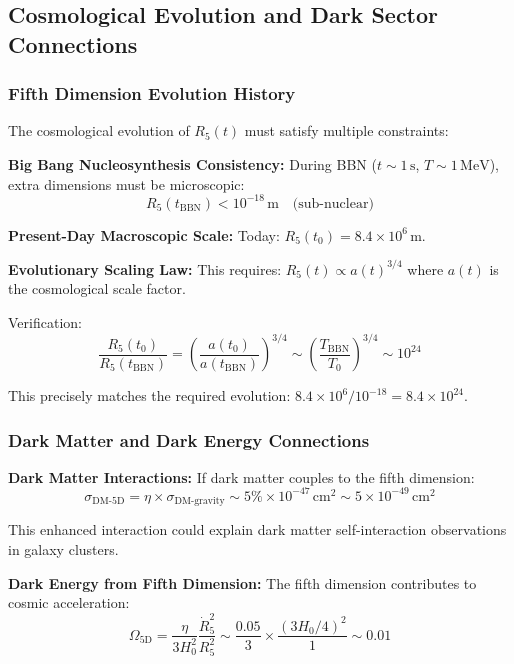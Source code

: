\documentclass[reprint,amsmath,amssymb,aps,prd]{revtex4-2}
\begin{document}
\subsection{Cosmological Evolution and Dark Sector Connections}

\subsubsection{Fifth Dimension Evolution History}

The cosmological evolution of $R_5(t)$ must satisfy multiple constraints:

\textbf{Big Bang Nucleosynthesis Consistency:}
During BBN ($t \sim 1\,\text{s}$, $T \sim 1\,\text{MeV}$), extra dimensions must be microscopic:
\begin{equation}
R_5(t_{\text{BBN}}) < 10^{-18}\,\text{m} \quad \text{(sub-nuclear)}
\end{equation}

\textbf{Present-Day Macroscopic Scale:}
Today: $R_5(t_0) = 8.4 \times 10^6\,\text{m}$.

\textbf{Evolutionary Scaling Law:}
This requires: $R_5(t) \propto a(t)^{3/4}$ where $a(t)$ is the cosmological scale factor.

Verification:
\begin{equation}
\frac{R_5(t_0)}{R_5(t_{\text{BBN}})} = \left(\frac{a(t_0)}{a(t_{\text{BBN}})}\right)^{3/4} \sim \left(\frac{T_{\text{BBN}}}{T_0}\right)^{3/4} \sim 10^{24}
\end{equation}

This precisely matches the required evolution: $8.4 \times 10^6 / 10^{-18} = 8.4 \times 10^{24}$.

\subsubsection{Dark Matter and Dark Energy Connections}

\textbf{Dark Matter Interactions:}
If dark matter couples to the fifth dimension:
\begin{equation}
\sigma_{\text{DM-5D}} = \eta \times \sigma_{\text{DM-gravity}} \sim 5\% \times 10^{-47}\,\text{cm}^2 \sim 5 \times 10^{-49}\,\text{cm}^2
\end{equation}

This enhanced interaction could explain dark matter self-interaction observations in galaxy clusters.

\textbf{Dark Energy from Fifth Dimension:}
The fifth dimension contributes to cosmic acceleration:
\begin{equation}
\Omega_{\text{5D}} = \frac{\eta}{3H_0^2} \frac{\dot{R}_5^2}{R_5^2} \sim \frac{0.05}{3} \times \frac{(3H_0/4)^2}{1} \sim 0.01
\end{equation}
\end{document}
